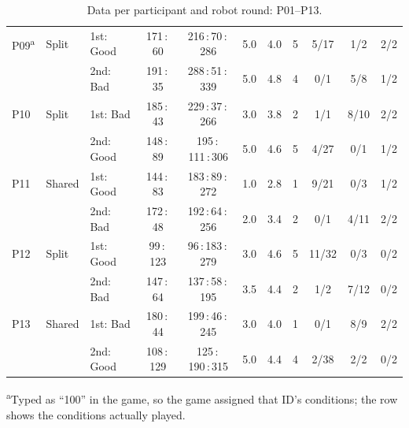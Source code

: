 \begin{table}[H]
\begin{tabular}{lllcccccccc}
P09\textsuperscript{a} & Split & 1st: Good & 171\,:\,60 & 216\,:\,70\,:\,286 & 5.0 & 4.0 & 5 & 5/17 & 1/2 & 2/2 \\
 & & 2nd: Bad & 191\,:\,35 & 288\,:\,51\,:\,339 & 5.0 & 4.8 & 4 & 0/1 & 5/8 & 1/2 \\
\midrule
P10 & Split & 1st: Bad & 185\,:\,43 & 229\,:\,37\,:\,266 & 3.0 & 3.8 & 2 & 1/1 & 8/10 & 2/2 \\
 & & 2nd: Good & 148\,:\,89 & 195\,:\,111\,:\,306 & 5.0 & 4.6 & 5 & 4/27 & 0/1 & 1/2 \\
\midrule
P11 & Shared & 1st: Good & 144\,:\,83 & 183\,:\,89\,:\,272 & 1.0 & 2.8 & 1 & 9/21 & 0/3 & 1/2 \\
 & & 2nd: Bad & 172\,:\,48 & 192\,:\,64\,:\,256 & 2.0 & 3.4 & 2 & 0/1 & 4/11 & 2/2 \\
\midrule
P12 & Split & 1st: Good & 99\,:\,123 & 96\,:\,183\,:\,279 & 3.0 & 4.6 & 5 & 11/32 & 0/3 & 0/2 \\
 & & 2nd: Bad & 147\,:\,64 & 137\,:\,58\,:\,195 & 3.5 & 4.4 & 2 & 1/2 & 7/12 & 0/2 \\
\midrule
P13 & Shared & 1st: Bad & 180\,:\,44 & 199\,:\,46\,:\,245 & 3.0 & 4.0 & 1 & 0/1 & 8/9 & 2/2 \\
 & & 2nd: Good & 108\,:\,129 & 125\,:\,190\,:\,315 & 5.0 & 4.4 & 4 & 2/38 & 2/2 & 0/2 \\
\bottomrule
\end{tabular}\par\smallskip\footnotesize\raggedright \textsuperscript{a}Typed as ``100'' in the game, so the game assigned that ID's conditions; the row shows the conditions actually played.
\caption{Data per participant and robot round: P01--P13.}
\label{tab:rawdata1}
\end{table}

